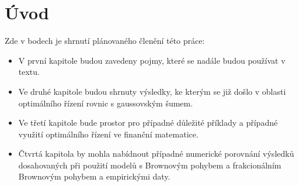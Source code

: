 
\chapter*{Úvod}

Zde v bodech je shrnutí plánovaného členění této práce:
\begin{itemize}
    \item V první kapitole budou zavedeny pojmy, které se nadále budou používat
        v textu.
    \item Ve druhé kapitole budou shrnuty výsledky, ke kterým se již došlo v
        oblasti optimálního řízení rovnic s gaussovským šumem.
    \item Ve třetí kapitole bude prostor pro případné důležité příklady a
        případné využití optimálního řízení ve finanční matematice.
    \item Čtvrtá kapitola by mohla nabídnout případné numerické porovnání výsledků
        dosahovaných při použití modelů s Brownovým pohybem a frakcionálním
        Brownovým pohybem a empirickými daty.
\end{itemize}





